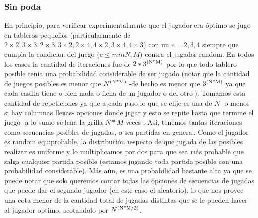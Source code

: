 \documentclass[A4paper,oneside,fleqn,11pt]{article}
\theoremstyle{definition}
\begin{document}
\subsubsection{Sin poda}
En principio, para verificar experimentalmente que el jugador era óptimo se jugo en tableros pequeños (particularmente de $2\times2, 3\times3, 2\times3, 3\times2, 2\times4, 4\times2, 3\times4, 4\times3$) con un $c=2, 3, 4$ siempre que cumpla la condicion del juego ($c\leq min{N,M}$) contra el jugador random. En todos los casos la cantidad de iteraciones fue de $2*3\textsuperscript{(N*M)}$ por lo que todo tablero posible tenía una probabilidad considerable de ser jugado (notar que la cantidad de juegos posibles es menor que  $N\textsuperscript{(N*M)}$ -de hecho es menor que $3\textsuperscript{(N*M)}$ ya que cada casilla tiene o bien nada o ficha de un jugador o del otro-). Tomamos esta cantidad de repeticiones ya que a cada paso lo que se elije es una de $N$ -o menos si hay columnas llenas- opciones donde jugar y esto se repite hasta que termine el juego -a lo sumo se lena la grilla $N*M$ veces-. Así, tenemos tantas iteraciones como secuencias posibles de jugadas, o sea partidas en general. Como el jugador es random equiprobable, la distribución respecto de que jugada de las posibles realizar es uniforme y lo multiplicamos por dos para que sea más probable que salga cualquier partida posible (estamos jugando toda partida posible con una probabilidad considerable). Más aún, es una probabilidad bastante alta ya que se puede notar que solo queremos contar todas las opciones de secuencias de jugadas que puede dar el segundo jugador (en este caso el aleatorio), lo que nos provee una cota menor de la cantidad total de jugadas distintas que se le pueden hacer al jugador optimo, acotandolo por $N\textsuperscript{(N*M/2)}$. 
\end{document}
